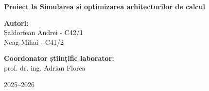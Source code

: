 \documentclass[12pt,a4paper]{article}
\begin{document}
	\thispagestyle{empty}

	\vspace*{2cm}

	\begin{center}
		{\Huge \textbf{Proiect la Simularea si optimizarea arhitecturilor de calcul}}
	\end{center}

	\vspace{5cm}

	\begin{flushright}
		{\Large \textbf{Autori:}}\\[0.2cm]
		{\Large Șaldorfean Andrei - C42/1}\\
		{\Large Neag Mihai - C41/2}
	\end{flushright}

	\vfill

	\begin{flushleft}
		{\Large \textbf{Coordonator științific laborator:}}\\[0.2cm]
		{\Large prof. dr. ing. Adrian Florea}
	\end{flushleft}

	\vfill

	\begin{center}
		{\Large 2025--2026}
	\end{center}

	\clearpage

	\tableofcontents

	\clearpage

	
	
	
	
	
	

	
	
\end{document}
